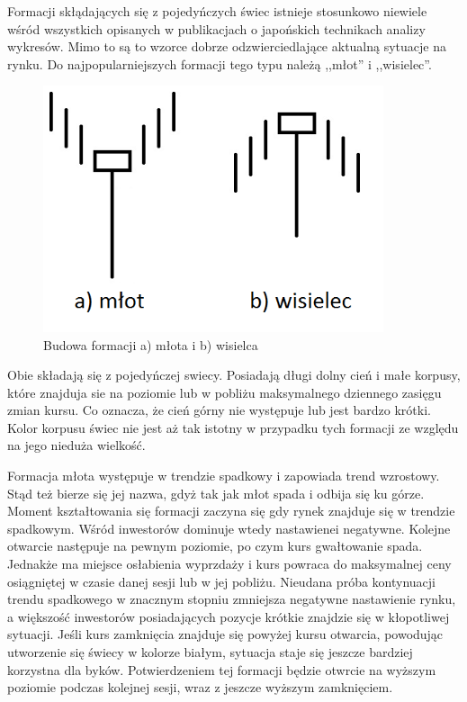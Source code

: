\documentclass[pdflatex,11pt]{aghdpl}
\begin{document}
Formacji skłądających się z pojedyńczych świec istnieje stosunkowo niewiele wśród wszystkich opisanych w publikacjach o japońskich technikach analizy wykresów. Mimo to są to wzorce dobrze odzwierciedlające aktualną sytuacje na rynku. Do najpopularniejszych formacji tego typu należą ,,młot'' i ,,wisielec''. 
\begin{figure}[ht]
\begin{center}
\includegraphics[width=10cm]{hammer.png}
\caption{Budowa formacji a) młota i b) wisielca}
\label{mlot}
\end{center}
\end{figure} 

Obie składają się z pojedyńczej swiecy. Posiadają długi dolny cień i małe korpusy, które znajduja sie na poziomie lub w pobliżu maksymalnego dziennego zasięgu zmian kursu. Co oznacza, że cień górny nie występuje lub jest bardzo krótki. Kolor korpusu świec nie jest aż tak istotny w przypadku tych formacji ze względu na jego nieduża wielkość.

Formacja młota występuje w trendzie spadkowy i zapowiada trend wzrostowy. Stąd też bierze się jej nazwa, gdyż tak jak młot spada i odbija się ku górze. Moment kształtowania się formacji zaczyna się gdy rynek znajduje się w trendzie spadkowym. Wśród inwestorów dominuje wtedy nastawienei negatywne. Kolejne otwarcie następuje na pewnym poziomie, po czym kurs gwałtowanie spada. Jednakże ma miejsce osłabienia wyprzdaży i kurs powraca do maksymalnej ceny osiągniętej w czasie danej sesji lub w jej pobliżu. Nieudana próba kontynuacji trendu spadkowego w znacznym stopniu zmniejsza negatywne nastawienie rynku, a większość inwestorów posiadających pozycje krótkie znajdzie się w kłopotliwej sytuacji. Jeśli kurs zamknięcia znajduje się powyżej kursu otwarcia, powodując utworzenie się świecy w kolorze białym, sytuacja staje się jeszcze bardziej korzystna dla byków. Potwierdzeniem tej formacji będzie otwrcie na wyższym poziomie podczas kolejnej sesji, wraz z jeszcze wyższym zamknięciem.  
\end{document}
